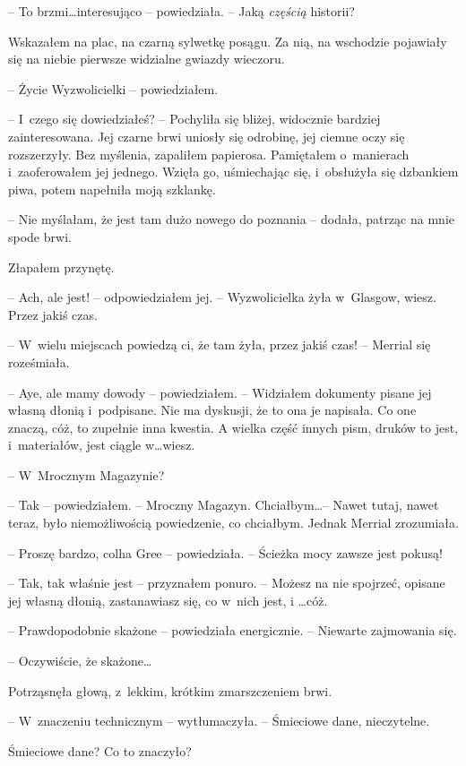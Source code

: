 \documentclass[oneside,polish,11pt,sfheadings]{mwbk}
\begin{document}
-- To brzmi\ldots interesująco -- powiedziała. -- Jaką \textit{częścią} historii?

Wskazałem na plac, na czarną sylwetkę posągu. Za nią, na wschodzie
pojawiały się na niebie pierwsze widzialne gwiazdy wieczoru.

-- Życie Wyzwolicielki -- powiedziałem.

-- I~czego się dowiedziałeś? -- Pochyliła się bliżej, widocznie bardziej
zainteresowana. Jej czarne brwi uniosły się odrobinę, jej ciemne oczy
się rozszerzyły. Bez myślenia, zapaliłem papierosa. Pamiętałem o~manierach i~zaoferowałem jej jednego. Wzięła go, uśmiechając się, i~obsłużyła się dzbankiem piwa, potem napełniła moją szklankę. 

-- Nie myślałam, że jest tam dużo nowego do poznania -- dodała, patrząc na
mnie spode brwi.

Złapałem przynętę. 

-- Ach, ale jest! -- odpowiedziałem jej. -- Wyzwolicielka żyła w~Glasgow, wiesz. Przez jakiś czas.

-- W~wielu miejscach powiedzą ci, że tam żyła, przez jakiś czas! -- Merrial się roześmiała.

-- Aye, ale mamy dowody -- powiedziałem. -- Widziałem dokumenty pisane jej
własną dłonią i~podpisane. Nie ma dyskusji, że to ona je napisała. Co
one znaczą, cóż, to zupełnie inna kwestia. A wielka część innych pism,
druków to jest, i~materiałów, jest ciągle w\ldots wiesz.

-- W~Mrocznym Magazynie?

-- Tak -- powiedziałem. -- Mroczny Magazyn. Chciałbym\ldots -- Nawet tutaj,
nawet teraz, było niemożliwością powiedzenie, co chciałbym. Jednak
Merrial zrozumiała.

-- Proszę bardzo, colha Gree -- powiedziała. -- Ścieżka mocy zawsze jest
pokusą!

-- Tak, tak właśnie jest -- przyznałem ponuro. -- Możesz na nie spojrzeć,
opisane jej własną dłonią, zastanawiasz się, co w~nich jest, i \ldots cóż.

-- Prawdopodobnie skażone -- powiedziała energicznie. -- Niewarte
zajmowania się.

-- Oczywiście, że skażone\ldots

Potrząsnęła głową, z~lekkim, krótkim zmarszczeniem brwi. 

-- W~znaczeniu technicznym -- wytłumaczyła. -- Śmieciowe dane, nieczytelne.

Śmieciowe dane? Co to znaczyło?
\end{document}
